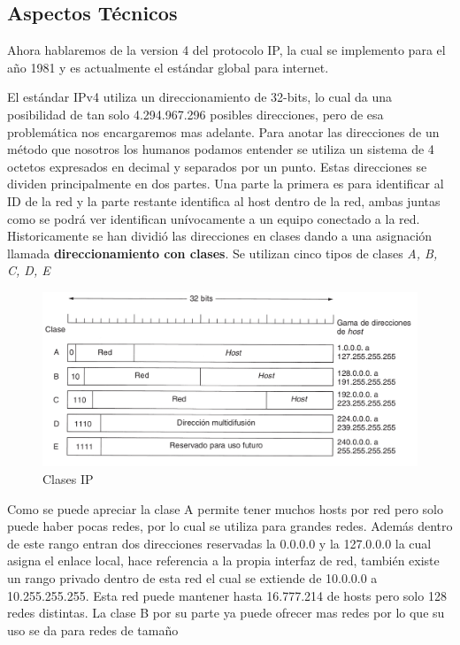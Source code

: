\documentclass[11pt,a4paper]{article}
\begin{document}
\subsection{Aspectos Técnicos}
Ahora hablaremos de la version 4 del protocolo IP, la cual se implemento para el año 1981 y es 
actualmente el estándar global para internet.\par
El estándar IPv4 utiliza un direccionamiento de 32-bits, lo cual da una posibilidad de tan solo 
4.294.967.296 posibles direcciones, pero de esa problemática nos encargaremos mas adelante. Para 
anotar las direcciones de un método que nosotros los humanos podamos entender se utiliza un sistema 
de 4 octetos expresados en decimal y separados por un punto. Estas direcciones se dividen 
principalmente en dos partes. Una parte la primera es para identificar al ID de la red y la parte
restante identifica al host dentro de la red, ambas juntas como se podrá ver identifican 
unívocamente a un equipo conectado a la red. Historicamente se han dividió las direcciones en clases
dando a una asignación llamada \textbf{direccionamiento con clases}. Se utilizan cinco tipos de 
clases \emph{A, B, C, D, E}
\begin{figure}[h!]
 \centering
 \includegraphics[width=1\textwidth]{clasesIP.png}
 \caption[Clases IP]{Clases IP}
\end{figure}\par
Como se puede apreciar la clase A permite tener muchos hosts por red pero solo puede haber pocas 
redes, por lo cual se utiliza para grandes redes. Además dentro de este rango entran dos direcciones 
reservadas la 0.0.0.0 y la 127.0.0.0 la cual asigna el enlace local, hace referencia a la propia 
interfaz de red, también existe un rango privado dentro de esta red el cual se extiende de 10.0.0.0 
a 10.255.255.255. Esta red puede mantener hasta 16.777.214 de hosts pero solo 128 redes distintas.
La clase B por su parte ya puede ofrecer mas redes por lo que su uso se da para redes de tamaño 
\end{document}
